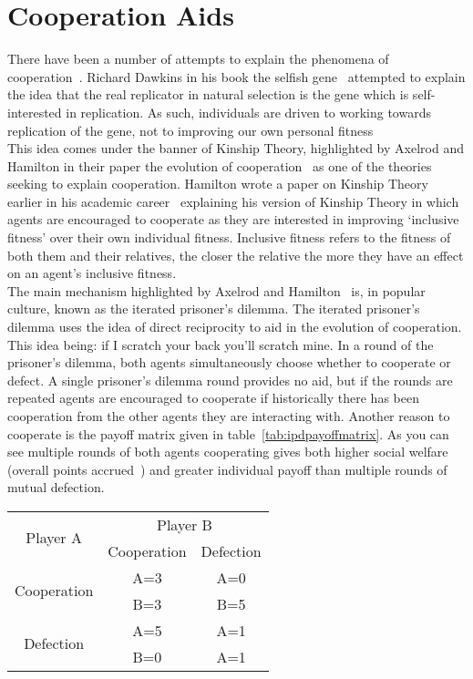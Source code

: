 \documentclass[]{final_report}
\begin{document}
\section{Cooperation Aids}
There have been a number of attempts to explain the phenomena of cooperation~\cite{kropotkin1902mutual, selfish_gene, evolution_of_cooperation, five_rules_coop}. Richard Dawkins in his book the selfish gene~\cite{selfish_gene} attempted to explain the idea that the real replicator in natural selection is the gene which is self-interested in replication. As such, individuals are driven to working towards replication of the gene, not to improving our own personal fitness\\
This idea comes under the banner of Kinship Theory, highlighted by Axelrod and Hamilton in their paper the evolution of cooperation~\cite{evolution_of_cooperation} as one of the theories seeking to explain cooperation. Hamilton wrote a paper on Kinship Theory earlier in his academic career~\cite{kinhamilton} explaining his version of Kinship Theory in which agents are encouraged to cooperate as they are interested in improving `inclusive fitness' over their own individual fitness. Inclusive fitness refers to the fitness of both them and their relatives, the closer the relative the more they have an effect on an agent's inclusive fitness.\\
The main mechanism highlighted by Axelrod and Hamilton~\cite{evolution_of_cooperation} is, in popular culture, known as the iterated prisoner's dilemma. The iterated prisoner's dilemma uses the idea of direct reciprocity to aid in the evolution of cooperation. This idea being: if I scratch your back you'll scratch  mine. In a round of the prisoner's dilemma, both agents simultaneously choose whether to cooperate or defect. A single prisoner's dilemma round provides no aid, but if the rounds are repeated agents are encouraged to cooperate if historically there has been cooperation from the other agents they are interacting with. Another reason to cooperate is the payoff matrix given in table~\ref{tab:ipdpayoffmatrix}. As you can see multiple rounds of both agents cooperating gives both higher social welfare (overall points accrued~\cite{kostas_deductive}) and greater individual payoff than multiple rounds of mutual defection.
\begin{framed}
	\begin{center}
		\begin{tabular}{c|c|c}
		\multirow{2}{*}{Player A} & \multicolumn{2}{c}{Player B}\\		
		& Cooperation & Defection\\
		\hline
		\multirow{2}{*}{Cooperation} & A=3 & A=0\\
		& B=3 & B=5\\
		\hline
		\multirow{2}{*}{Defection} & A=5 & A=1\\
		& B=0 & A=1\\
		\end{tabular}
		\label{tab:ipdpayoffmatrix}
	\end{center}	
\end{framed}
\end{document}
